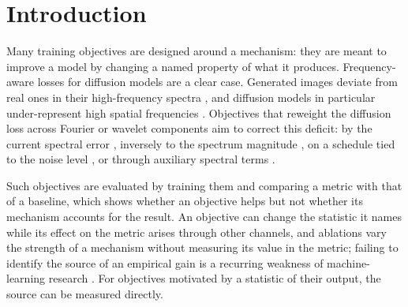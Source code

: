 \section{Introduction}
\label{sec:intro}

Many training objectives are designed around a mechanism: they are meant to
improve a model by changing a named property of what it produces.
Frequency-aware losses for diffusion models are a clear case. Generated images
deviate from real ones in their high-frequency spectra
\citep{durall2020watch,dzanic2020fourier,frank2020leveraging,schwarz2021frequency},
and diffusion models in particular under-represent high spatial frequencies
\citep{ricker2024towards,yang2023diffusion}. Objectives that reweight the
diffusion loss across Fourier or wavelet components aim to correct this
deficit: by the current spectral error \citep{jiang2021focal}, inversely to
the spectrum magnitude \citep{yang2023diffusion}, on a schedule tied to the
noise level \citep{thao2026awwl}, or through auxiliary spectral terms
\citep{chandran2026spectral}.

Such objectives are evaluated by training them and comparing a metric with
that of a baseline, which shows whether an objective helps but not whether
its mechanism accounts for the result. An objective can change the statistic
it names while its effect on the metric arises through other channels, and
ablations vary the strength of a mechanism without measuring its value in the
metric; failing to identify the source of an empirical gain is a recurring
weakness of machine-learning research \citep{lipton2019troubling}. For
objectives motivated by a statistic of their output, the source can be
measured directly.

